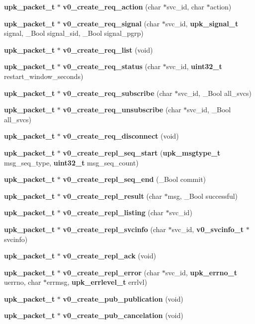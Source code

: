 \begin{DoxyCompactItemize}
\item 
{\bf upk\_\-packet\_\-t} $\ast$ {\bf v0\_\-create\_\-req\_\-action} (char $\ast$svc\_\-id, char $\ast$action)
\item 
{\bf upk\_\-packet\_\-t} $\ast$ {\bf v0\_\-create\_\-req\_\-signal} (char $\ast$svc\_\-id, {\bf upk\_\-signal\_\-t} signal, \_\-Bool signal\_\-sid, \_\-Bool signal\_\-pgrp)
\item 
{\bf upk\_\-packet\_\-t} $\ast$ {\bf v0\_\-create\_\-req\_\-list} (void)
\item 
{\bf upk\_\-packet\_\-t} $\ast$ {\bf v0\_\-create\_\-req\_\-status} (char $\ast$svc\_\-id, {\bf uint32\_\-t} restart\_\-window\_\-seconds)
\item 
{\bf upk\_\-packet\_\-t} $\ast$ {\bf v0\_\-create\_\-req\_\-subscribe} (char $\ast$svc\_\-id, \_\-Bool all\_\-svcs)
\item 
{\bf upk\_\-packet\_\-t} $\ast$ {\bf v0\_\-create\_\-req\_\-unsubscribe} (char $\ast$svc\_\-id, \_\-Bool all\_\-svcs)
\item 
{\bf upk\_\-packet\_\-t} $\ast$ {\bf v0\_\-create\_\-req\_\-disconnect} (void)
\item 
{\bf upk\_\-packet\_\-t} $\ast$ {\bf v0\_\-create\_\-repl\_\-seq\_\-start} ({\bf upk\_\-msgtype\_\-t} msg\_\-seq\_\-type, {\bf uint32\_\-t} msg\_\-seq\_\-count)
\item 
{\bf upk\_\-packet\_\-t} $\ast$ {\bf v0\_\-create\_\-repl\_\-seq\_\-end} (\_\-Bool commit)
\item 
{\bf upk\_\-packet\_\-t} $\ast$ {\bf v0\_\-create\_\-repl\_\-result} (char $\ast$msg, \_\-Bool successful)
\item 
{\bf upk\_\-packet\_\-t} $\ast$ {\bf v0\_\-create\_\-repl\_\-listing} (char $\ast$svc\_\-id)
\item 
{\bf upk\_\-packet\_\-t} $\ast$ {\bf v0\_\-create\_\-repl\_\-svcinfo} (char $\ast$svc\_\-id, {\bf v0\_\-svcinfo\_\-t} $\ast$svcinfo)
\item 
{\bf upk\_\-packet\_\-t} $\ast$ {\bf v0\_\-create\_\-repl\_\-ack} (void)
\item 
{\bf upk\_\-packet\_\-t} $\ast$ {\bf v0\_\-create\_\-repl\_\-error} (char $\ast$svc\_\-id, {\bf upk\_\-errno\_\-t} uerrno, char $\ast$errmsg, {\bf upk\_\-errlevel\_\-t} errlvl)
\item 
{\bf upk\_\-packet\_\-t} $\ast$ {\bf v0\_\-create\_\-pub\_\-publication} (void)
\item 
{\bf upk\_\-packet\_\-t} $\ast$ {\bf v0\_\-create\_\-pub\_\-cancelation} (void)
\item 

\end{DoxyCompactItemize}
